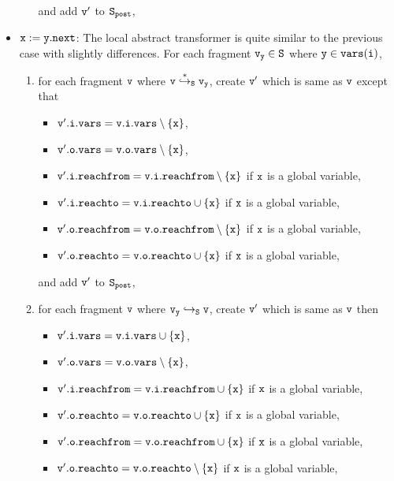 \begin{itemize}
\begin{enumerate}
\begin{itemize}
\end{itemize}
and add $\tt v'$ to $\tt S_{post}$,
\end{enumerate}

	
	
	
	
	
	
	
	
	
	
	
\item ${\tt x := y.next}$: The local abstract transformer is quite similar to the previous case with slightly differences. For each fragment $\tt v_y \in S$ where $\tt y \in {\tt vars}(\tt i)$,
\begin{enumerate}
\item  for each fragment $\tt v$ where $\tt v \overset{*}\hookrightarrow_S v_y$, create $\tt v'$ which is same as $\tt v$ except that
\begin{itemize}
\item $\tt v'.i.vars = v.i.vars \setminus \{x\}$,
\item $\tt v'.o.vars = v.o.vars \setminus \{x\}$,
\item $\tt v'.i.reachfrom = v.i.reachfrom \setminus \{x\}$ if $\tt x$ is a global variable,

\item $\tt v'.i.reachto = v.i.reachto \cup \{x\}$ if $\tt x$ is a global variable,
\item $\tt v'.o.reachfrom = v.o.reachfrom \setminus \{x\}$ if $\tt x$ is a global variable,

 \item $\tt v'.o.reachto = v.o.reachto \cup \{x\}$ if $\tt x$ is a global variable,
\end{itemize}
and add $\tt v'$ to $\tt S_{post}$,
\item for each fragment $\tt v$ where $\tt v_y \hookrightarrow_S v$, create $\tt v'$ which is same as $\tt v$ then
\begin{itemize}
\item $\tt v'.i.vars = v.i.vars \cup \{x\}$,
\item $\tt v'.o.vars = v.o.vars \setminus \{x\}$,
\item $\tt v'.i.reachfrom = v.i.reachfrom \cup \{x\}$ if $\tt x$ is a global variable,
 \item $\tt v'.o.reachto = v.o.reachto \cup \{x\}$ if $\tt x$ is a global variable,
 \item $\tt v'.o.reachfrom = v.o.reachfrom \cup \{x\}$ if $\tt x$ is a global variable,
 \item $\tt v'.o.reachto = v.o.reachto \setminus \{x\}$ if $\tt x$ is a global variable,


\end{itemize}
\end{enumerate}
\end{itemize}
